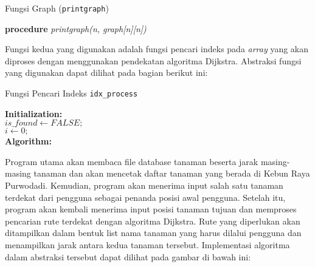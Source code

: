 \documentclass[conference]{IEEEtran}
\begin{document}
\begin{algorithm}
    \caption{Fungsi Graph (\texttt{printgraph})}
    \SetAlgoLined
    \DontPrintSemicolon
   
    \textbf{procedure} \textit{printgraph(n, graph[n][n])}\\
\end{algorithm}

Fungsi kedua yang digunakan adalah fungsi pencari indeks pada \textit{array} yang akan diproses dengan menggunakan pendekatan algoritma Dijkstra. Abstraksi fungsi yang digunakan dapat dilihat pada bagian berikut ini:

\begin{algorithm}
    \caption{Fungsi Pencari Indeks \texttt{idx\_process}}
    \SetAlgoLined
    \DontPrintSemicolon
   
    \textbf{Initialization:}\\
    $is\_found \gets FALSE;$\\
    $i \gets 0;$\\
    \textbf{Algorithm:}\\
\end{algorithm}

Program utama akan membaca file database tanaman beserta jarak masing-masing tanaman dan akan mencetak daftar tanaman yang berada di Kebun Raya Purwodadi. Kemudian, program akan menerima input salah satu tanaman terdekat dari pengguna sebagai penanda posisi awal pengguna. Setelah itu, program akan kembali menerima input posisi tanaman tujuan dan memproses pencarian rute terdekat dengan algoritma Dijkstra. Rute yang diperlukan akan ditampilkan dalam bentuk list nama tanaman yang harus dilalui pengguna dan menampilkan jarak antara kedua tanaman tersebut. Implementasi algoritma dalam abstraksi tersebut dapat dilihat pada gambar di bawah ini:
\end{document}
